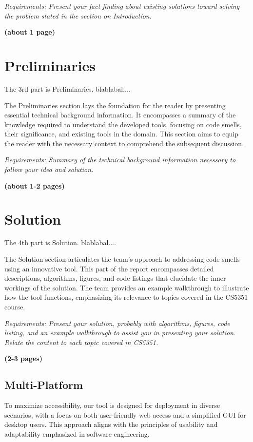 \documentclass[journal]{IEEEtran}
\begin{document}
\textit{Requirements: Present your fact finding about existing solutions toward solving the problem stated in the section on Introduction}. 

\textbf{(about 1 page)}

\section{Preliminaries}
\noindent The 3rd part is Preliminaries.
blablabal....

The Preliminaries section lays the foundation for the reader by presenting essential technical background information. It encompasses a summary of the knowledge required to understand the developed tools, focusing on code smells, their significance, and existing tools in the domain. This section aims to equip the reader with the necessary context to comprehend the subsequent discussion.

\textit{Requirements: Summary of the technical background information necessary to follow your idea and solution.} 

\textbf{(about 1-2 pages)}

\section{Solution}
\noindent The 4th part is Solution.
blablabal....

The Solution section articulates the team's approach to addressing code smells using an innovative tool. This part of the report encompasses detailed descriptions, algorithms, figures, and code listings that elucidate the inner workings of the solution. The team provides an example walkthrough to illustrate how the tool functions, emphasizing its relevance to topics covered in the CS5351 course.

\textit{Requirements: Present your solution, probably with algorithms, figures, code listing, and an example walkthrough to assist you in presenting your solution. Relate the content to each topic covered in CS5351.}

\textbf{(2-3 pages)}


\subsection{Multi-Platform}

To maximize accessibility, our tool is designed for deployment in diverse scenarios, with a focus on both user-friendly web access and a simplified GUI for desktop users. This approach aligns with the principles of usability and adaptability emphasized in software engineering.
\end{document}
